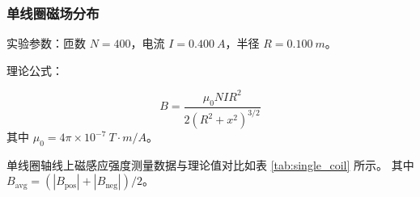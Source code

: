 \documentclass{../template/Report}%
\begin{document}
\begin{fullreportonly}
    \subsubsection{单线圈磁场分布}

    实验参数：匝数 $N=400$，电流 $I=\SI{0.400}{A}$，半径 $R=\SI{0.100}{m}$。

    理论公式：

    \begin{equation*}
        B = \frac{\mu_0 N I R^2}{2(R^2 + x^2)^{3/2}}
    \end{equation*}
    其中 $\mu_0 = 4\pi \times 10^{-7} \ \si{T\cdot m/A}$。

    单线圈轴线上磁感应强度测量数据与理论值对比如表 \ref{tab:single_coil} 所示。
    其中 $B_{\text{avg}} = (|B_{\text{pos}}| + |B_{\text{neg}}|)/2$。


\end{fullreportonly}
\end{document}
